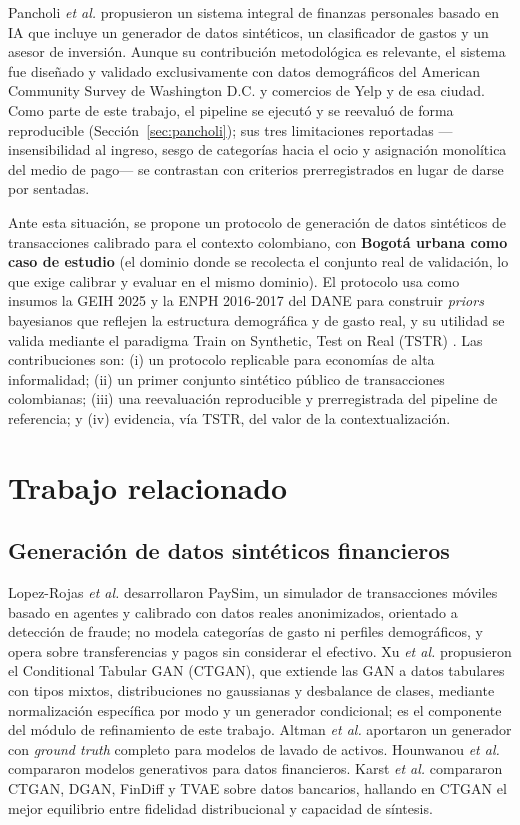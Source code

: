 \documentclass[journal]{IEEEtai}
\begin{document}
Pancholi \textit{et al.} \cite{pancholi2026} propusieron un sistema integral de finanzas personales basado en IA que incluye un generador de datos sintéticos, un clasificador de gastos y un asesor de inversión. Aunque su contribución metodológica es relevante, el sistema fue diseñado y validado exclusivamente con datos demográficos del American Community Survey de Washington D.C. y comercios de Yelp y de esa ciudad. Como parte de este trabajo, el pipeline se ejecutó y se reevaluó de forma reproducible (Sección~\ref{sec:pancholi}); sus tres limitaciones reportadas —insensibilidad al ingreso, sesgo de categorías hacia el ocio y asignación monolítica del medio de pago— se contrastan con criterios prerregistrados en lugar de darse por sentadas.

Ante esta situación, se propone un protocolo de generación de datos sintéticos de transacciones calibrado para el contexto colombiano, con \textbf{Bogotá urbana como caso de estudio} (el dominio donde se recolecta el conjunto real de validación, lo que exige calibrar y evaluar en el mismo dominio). El protocolo usa como insumos la GEIH 2025 y la ENPH 2016-2017 del DANE para construir \textit{priors} bayesianos que reflejen la estructura demográfica y de gasto real, y su utilidad se valida mediante el paradigma Train on Synthetic, Test on Real (TSTR) \cite{esteban2017}. Las contribuciones son: (i) un protocolo replicable para economías de alta informalidad; (ii) un primer conjunto sintético público de transacciones colombianas; (iii) una reevaluación reproducible y prerregistrada del pipeline de referencia; y (iv) evidencia, vía TSTR, del valor de la contextualización.

\section{Trabajo relacionado}
\subsection{Generación de datos sintéticos financieros}
Lopez-Rojas \textit{et al.} \cite{paysim2016} desarrollaron PaySim, un simulador de transacciones móviles basado en agentes y calibrado con datos reales anonimizados, orientado a detección de fraude; no modela categorías de gasto ni perfiles demográficos, y opera sobre transferencias y pagos sin considerar el efectivo. Xu \textit{et al.} \cite{ctgan2019} propusieron el Conditional Tabular GAN (CTGAN), que extiende las GAN a datos tabulares con tipos mixtos, distribuciones no gaussianas y desbalance de clases, mediante normalización específica por modo y un generador condicional; es el componente del módulo de refinamiento de este trabajo. Altman \textit{et al.} \cite{altman2023} aportaron un generador con \textit{ground truth} completo para modelos de lavado de activos. Hounwanou \textit{et al.} \cite{hounwanou2025} compararon modelos generativos para datos financieros. Karst \textit{et al.} \cite{karst2024} compararon CTGAN, DGAN, FinDiff y TVAE sobre datos bancarios, hallando en CTGAN el mejor equilibrio entre fidelidad distribucional y capacidad de síntesis.
\end{document}
